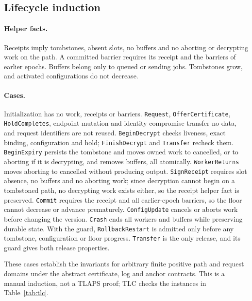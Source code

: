 \documentclass[pdflatex,sn-mathphys-num]{sn-jnl}
\theoremstyle{plain}
\theoremstyle{definition}
\newcommand{\code}[1]{\texttt{#1}}
\begin{document}
\begin{appendices}
\section{Lifecycle induction}\label{app:lifecycle}

\paragraph{Helper facts.}
Receipts imply tombstones, absent slots, no buffers and no aborting or decrypting work on the path. A committed barrier requires its receipt and the barriers of earlier epochs. Buffers belong only to queued or sending jobs. Tombstones grow, and activated configurations do not decrease.

\paragraph{Cases.}
Initialization has no work, receipts or barriers. \code{Request}, \code{OfferCertificate}, \code{HoldCompletes}, endpoint mutation and identity compromise transfer no data, and request identifiers are not reused. \code{BeginDecrypt} checks liveness, exact binding, configuration and hold; \code{FinishDecrypt} and \code{Transfer} recheck them. \code{BeginExpiry} persists the tombstone and moves owned work to cancelled, or to aborting if it is decrypting, and removes buffers, all atomically. \code{WorkerReturns} moves aborting to cancelled without producing output. \code{SignReceipt} requires slot absence, no buffers and no aborting work; since decryption cannot begin on a tombstoned path, no decrypting work exists either, so the receipt helper fact is preserved. \code{Commit} requires the receipt and all earlier-epoch barriers, so the floor cannot decrease or advance prematurely. \code{ConfigUpdate} cancels or aborts work before changing the version. \code{Crash} ends all workers and buffers while preserving durable state. With the guard, \code{RollbackRestart} is admitted only before any tombstone, configuration or floor progress. \code{Transfer} is the only release, and its guard gives both release properties.

These cases establish the invariants for arbitrary finite positive path and request domains under the abstract certificate, log and anchor contracts. This is a manual induction, not a TLAPS proof; TLC checks the instances in Table~\ref{tab:tlc}.


\end{appendices}
\end{document}
